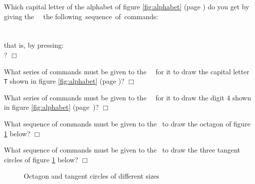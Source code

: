 \begin{exercice}{
Which capital letter of the alphabet  of figure \ref{fig:alphabet} (page \pageref{fig:alphabet})
do you get by giving the \robot\ \robotCbN\ the \hbox{following sequence of commands:}\\
\hspace*{2ex}{\idt fd();\ fd();\ qtr();\ fd();\ qtr();\ qtr();\ fd()}\\
\hspace*{2ex}{\idt qtr();\ fd();\ fd();\ qtr();\ fd();\ fd()}\\
that is, by \hbox{pressing:}\\
\hspace*{2ex}  \touche{$+$}  \touche{$+$} \touche{$+$}  \touche{$+$} 
 \touche{$+$}  ?
$\Box$}\end{exercice}

\begin{exercice}{
What series of commands must be given to the \robot\ \robotCbN\ for it to draw
the capital letter {\tt T} shown in figure \ref{fig:alphabet} (page \pageref{fig:alphabet})?
$\Box$}\end{exercice}

\begin{exercice}{
What series of commands must be given to the \robot\ \robotCbN\ for it to draw the digit 4
shown in figure \ref{fig:alphabet} \hbox{(page \pageref{fig:alphabet})?}
$\Box$}\end{exercice}

\begin{exercice}{
What sequence of commands must be given to the \robot\ to
draw the octagon of figure \ref{fig:octogone-cercles}
\hbox{below?}
$\Box$}\end{exercice}

\begin{exercice}{
What sequence of commands must be given to the \robot\ to
draw the three tangent circles of figure \ref{fig:octogone-cercles}
\hbox{below?}
$\Box$}\end{exercice}

\begin{figure}[htbp]
 \caption{Octagon and tangent circles of different sizes}
 \label{fig:octogone-cercles}
\end{figure}

